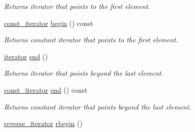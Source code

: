 \begin{CompactItemize}
\begin{CompactList}\small\item\em Returns iterator that points to the first element. \item\end{CompactList}\item 
\hypertarget{classdai_1_1smallSet_3f0650aa385a3fa8baa1903762815203}{
\hyperlink{classdai_1_1smallSet_103c819872818d14a7234a1f618a815c}{const\_\-iterator} \hyperlink{classdai_1_1smallSet_3f0650aa385a3fa8baa1903762815203}{begin} () const }
\label{classdai_1_1smallSet_3f0650aa385a3fa8baa1903762815203}

\begin{CompactList}\small\item\em Returns constant iterator that points to the first element. \item\end{CompactList}\item 
\hypertarget{classdai_1_1smallSet_9927551b475689ed06d0380f26df8eea}{
\hyperlink{classdai_1_1smallSet_254dd4f8cad9c7bce5522e9dbcfc4f49}{iterator} \hyperlink{classdai_1_1smallSet_9927551b475689ed06d0380f26df8eea}{end} ()}
\label{classdai_1_1smallSet_9927551b475689ed06d0380f26df8eea}

\begin{CompactList}\small\item\em Returns iterator that points beyond the last element. \item\end{CompactList}\item 
\hypertarget{classdai_1_1smallSet_1d4c72c01f605b4bc65c73d1ba259e05}{
\hyperlink{classdai_1_1smallSet_103c819872818d14a7234a1f618a815c}{const\_\-iterator} \hyperlink{classdai_1_1smallSet_1d4c72c01f605b4bc65c73d1ba259e05}{end} () const }
\label{classdai_1_1smallSet_1d4c72c01f605b4bc65c73d1ba259e05}

\begin{CompactList}\small\item\em Returns constant iterator that points beyond the last element. \item\end{CompactList}\item 
\hypertarget{classdai_1_1smallSet_316cf77f22a243a7f68558787b7183c4}{
\hyperlink{classdai_1_1smallSet_6dea3ee0aa40c4312e6278a7d17f516d}{reverse\_\-iterator} \hyperlink{classdai_1_1smallSet_316cf77f22a243a7f68558787b7183c4}{rbegin} ()}
\label{classdai_1_1smallSet_316cf77f22a243a7f68558787b7183c4}


\end{CompactItemize}

